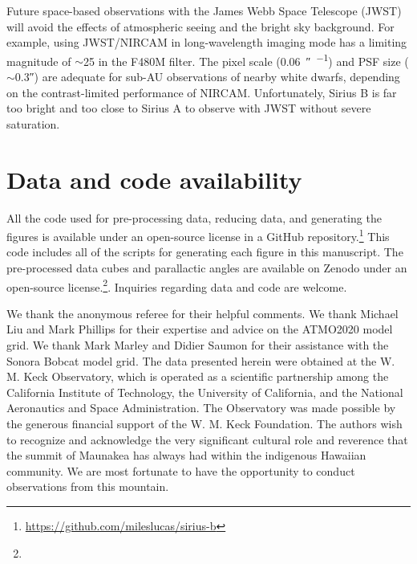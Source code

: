 \documentclass[twocolumn,linenumbers]{aastex631}
\begin{document}
Future space-based observations with the James Webb Space Telescope (JWST) will avoid the effects of atmospheric seeing and the bright sky background. For example, using JWST/NIRCAM in long-wavelength imaging mode has a limiting magnitude of $\sim$25 in the F480M filter. The pixel scale (\qty{0.06}{\arcsecond\per\pixel}) and PSF size ($\sim$\ang{;;0.3}) are adequate for sub-AU observations of nearby white dwarfs, depending on the contrast-limited performance of NIRCAM. Unfortunately, Sirius B is far too bright and too close to Sirius A to observe with JWST without severe saturation.

\section{Data and code availability}\label{sec:data}

All the code used for pre-processing data, reducing data, and generating the figures is available under an open-source license in a GitHub repository.\footnote{\url{https://github.com/mileslucas/sirius-b}} This code includes all of the scripts for generating each figure in this manuscript. The pre-processed data cubes and parallactic angles are available on Zenodo under an open-source license.\footnote{}. Inquiries regarding data and code are welcome.

\begin{acknowledgements}
We thank the anonymous referee for their helpful comments. We thank Michael Liu and Mark Phillips for their expertise and advice on the ATMO2020 model grid. We thank Mark Marley and Didier Saumon for their assistance with the Sonora Bobcat model grid. The data presented herein were obtained at the W. M. Keck Observatory, which is operated as a scientific partnership among the California Institute of Technology, the University of California, and the National Aeronautics and Space Administration. The Observatory was made possible by the generous financial support of the W. M. Keck Foundation. The authors wish to recognize and acknowledge the very significant cultural role and reverence that the summit of Maunakea has always had within the indigenous Hawaiian community. We are most fortunate to have the opportunity to conduct observations from this mountain.
\end{acknowledgements}



\end{document}
